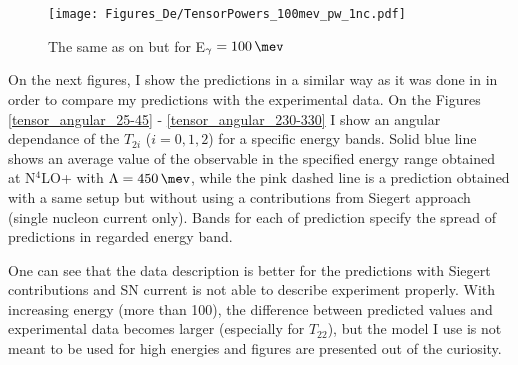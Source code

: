     \begin{figure}[h]
        \begin{center}
        \texttt{[image: Figures\_De/TensorPowers\_100mev\_pw\_1nc.pdf]}
        \end{center}
        \caption{The same as on  but for E$_\gamma=\SI{100}{\mev}$}
        \label{tensor_pw_1nc_100mev}
    \end{figure}


    
    On the next figures, I show the predictions in a similar way as it was done
    in \cite{rachek2007} in order to compare my predictions with the experimental
    data. On the Figures \ref{tensor_angular_25-45} - \ref{tensor_angular_230-330}
    I show an angular dependance of the $T_{2i}$ ($i=0,1,2$) for a specific energy bands.
    Solid blue line shows an average value of the observable in the specified energy range
    obtained at N$^4$LO+ with $\Lambda=\SI{450}{\mev}$, while the pink dashed line is a prediction
    obtained with a same setup but without using a contributions from Siegert approach
    (single nucleon current only). Bands for each of prediction specify the spread of
    predictions in regarded energy band.
    
    One can see that the data description is better for the predictions with Siegert contributions 
    and SN current is not able to describe experiment properly. With increasing energy 
    (more than \SI{100}{\mev}),
    the difference between predicted values and experimental data becomes larger
    (especially for $T_{22}$), but the model I use is not meant to be used for high energies 
    and figures are presented out of the curiosity. 
    




